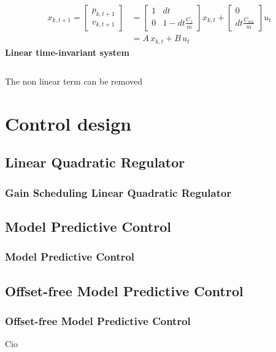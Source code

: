 \documentclass[10pt, aspectratio=169]{beamer}
\begin{document}
\begin{frame}[t]
\begin{columns}
\begin{column}{0.6\textwidth}
\begin{equation*}
    \begin{aligned}
    	x_{k,t+1} = 
    		\begin{bmatrix}
    			p_{k,t+1} \\
    			v_{k,t+1}
    		\end{bmatrix}
    		& =
    		\begin{bmatrix}
    			1 & dt \\
    			0 & 1-dt\frac{C_f}{m}
    		\end{bmatrix}
    		x_{k,t}
    		+
    		\begin{bmatrix}
    			0 \\
    			dt \frac{C_{m1}}{m}
    		\end{bmatrix}
    		u_t \\
    		& = A \, x_{k,t} + B \, u_t
    \end{aligned}
\end{equation*}
 \hspace{2.5cm}\textbf{Linear time-invariant system}
\end{column}
\end{columns}
\hspace{0.4cm}
\vspace{0.4cm}
The non linear term can be removed

\end{frame}

\section{Control design}
\subsection{Linear Quadratic Regulator}
\begin{frame}[t]
\frametitle{Gain Scheduling Linear Quadratic Regulator}
\end{frame}


\subsection{Model Predictive Control}
\begin{frame}
\frametitle{Model Predictive Control}
\end{frame}


\subsection{Offset-free Model Predictive Control}
\begin{frame}
\frametitle{Offset-free Model Predictive Control}
Cio
\end{frame}
\end{document}
